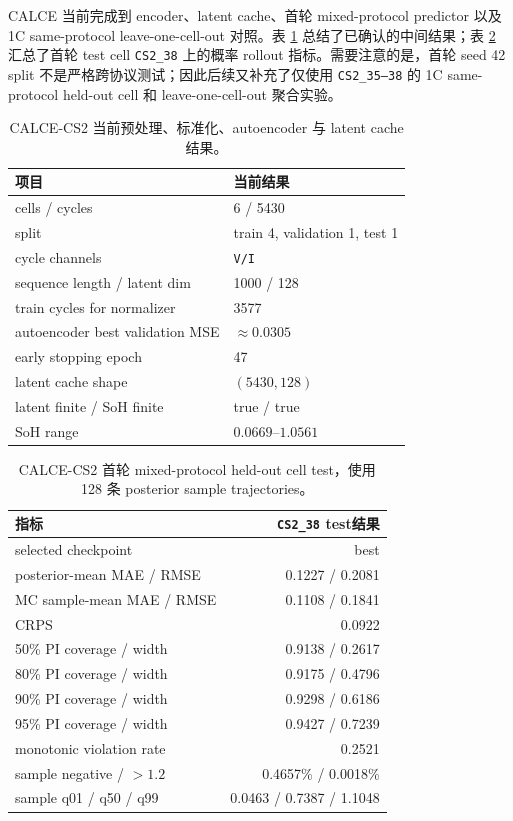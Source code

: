 \documentclass[11pt,a4paper,fontset=none]{ctexart}
\begin{document}
CALCE 当前完成到 encoder、latent cache、首轮 mixed-protocol predictor 以及
1C same-protocol leave-one-cell-out 对照。表 \ref{tab:calce_pretrain}
总结了已确认的中间结果；表 \ref{tab:calce_predictor_test} 汇总了首轮
test cell \texttt{CS2\_38} 上的概率 rollout 指标。需要注意的是，首轮
seed 42 split 不是严格跨协议测试；因此后续又补充了仅使用
\texttt{CS2\_35--38} 的 1C same-protocol held-out cell 和
leave-one-cell-out 聚合实验。

\begin{table}[h]
\centering
\small
\begin{tabular}{ll}
\toprule
项目 & 当前结果 \\
\midrule
cells / cycles & 6 / 5430 \\
split & train 4, validation 1, test 1 \\
cycle channels & \texttt{V/I} \\
sequence length / latent dim & 1000 / 128 \\
train cycles for normalizer & 3577 \\
autoencoder best validation MSE & $\approx 0.0305$ \\
early stopping epoch & 47 \\
latent cache shape & $(5430,128)$ \\
latent finite / SoH finite & true / true \\
SoH range & $0.0669$--$1.0561$ \\
\bottomrule
\end{tabular}
\caption{CALCE-CS2 当前预处理、标准化、autoencoder 与 latent cache 结果。}
\label{tab:calce_pretrain}
\end{table}

\begin{table}[h]
\centering
\small
\begin{tabular}{lr}
\toprule
指标 & \texttt{CS2\_38} test结果 \\
\midrule
selected checkpoint & best \\
posterior-mean MAE / RMSE & 0.1227 / 0.2081 \\
MC sample-mean MAE / RMSE & 0.1108 / 0.1841 \\
CRPS & 0.0922 \\
50\% PI coverage / width & 0.9138 / 0.2617 \\
80\% PI coverage / width & 0.9175 / 0.4796 \\
90\% PI coverage / width & 0.9298 / 0.6186 \\
95\% PI coverage / width & 0.9427 / 0.7239 \\
monotonic violation rate & 0.2521 \\
sample negative / $>1.2$ & 0.4657\% / 0.0018\% \\
sample q01 / q50 / q99 & 0.0463 / 0.7387 / 1.1048 \\
\bottomrule
\end{tabular}
\caption{CALCE-CS2 首轮 mixed-protocol held-out cell test，使用 128 条 posterior sample trajectories。}
\label{tab:calce_predictor_test}
\end{table}
\end{document}
